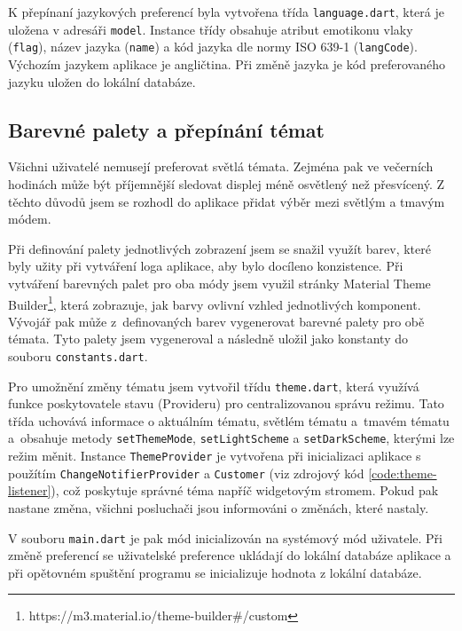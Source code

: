 \documentclass[czech, bc, kiv, he, iso690numb]{fasthesis}
\begin{document}
K přepínaní jazykových preferencí byla vytvořena třída \texttt{language.dart}, která je uložena v adresáři \texttt{model}. Instance třídy obsahuje atribut emotikonu vlaky (\texttt{flag}), název jazyka (\texttt{name}) a kód jazyka dle normy ISO 639-1 (\texttt{langCode}). Výchozím jazykem aplikace je angličtina. Při změně jazyka je kód preferovaného jazyku uložen do lokální databáze.

\subsection{Barevné palety a přepínání témat}

Všichni uživatelé nemusejí preferovat světlá témata. Zejména pak ve večerních hodinách může být příjemnější sledovat displej méně osvětlený než přesvícený. Z těchto důvodů jsem se rozhodl do aplikace přidat výběr mezi světlým a tmavým módem. 

Při definování palety jednotlivých zobrazení jsem se snažil využít barev, které byly užity při vytváření loga aplikace, aby bylo docíleno konzistence. Při vytváření barevných palet pro oba módy jsem využil stránky Material Theme Builder\footnote{https://m3.material.io/theme-builder\#/custom}, která zobrazuje, jak barvy ovlivní vzhled jednotlivých komponent. Vývojář pak může z~definovaných barev vygenerovat barevné palety pro obě témata. Tyto palety jsem vygeneroval a následně uložil jako konstanty do souboru \texttt{constants.dart}. 

Pro umožnění změny tématu jsem vytvořil třídu \texttt{theme.dart}, která využívá funkce poskytovatele stavu (Provideru) pro centralizovanou správu režimu. Tato třída uchovává informace o aktuálním tématu, světlém tématu a~tmavém tématu a~obsahuje metody \texttt{setThemeMode}, \texttt{setLightScheme} a \texttt{setDarkScheme}, kterými lze režim měnit. Instance \texttt{ThemeProvider} je vytvořena při inicializaci aplikace s použítím \texttt{ChangeNotifierProvider} a \texttt{Customer} (viz zdrojový kód \ref{code:theme-listener}), což poskytuje správné téma napříč widgetovým stromem. Pokud pak nastane změna, všichni posluchači jsou informováni o změnách, které nastaly. 

V souboru \texttt{main.dart} je pak mód inicializován na systémový mód uživatele. Při změně preferencí se uživatelské preference ukládají do lokální databáze aplikace a při opětovném spuštění programu se inicializuje hodnota z lokální databáze.

\newpage
\end{document}
